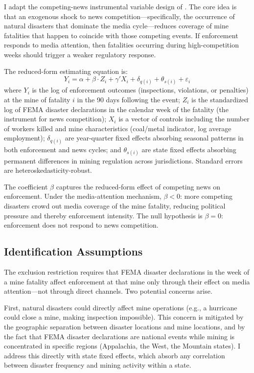 \documentclass[12pt]{article}
\begin{document}
I adapt the competing-news instrumental variable design of \citet{eisensee2007news}. The core idea is that an exogenous shock to news competition---specifically, the occurrence of natural disasters that dominate the media cycle---reduces coverage of mine fatalities that happen to coincide with those competing events. If enforcement responds to media attention, then fatalities occurring during high-competition weeks should trigger a weaker regulatory response.

The reduced-form estimating equation is:
\begin{equation}
\label{eq:reduced}
Y_{i} = \alpha + \beta \cdot Z_{i} + \gamma' X_{i} + \delta_{q(i)} + \theta_{s(i)} + \varepsilon_{i}
\end{equation}
where $Y_{i}$ is the log of enforcement outcomes (inspections, violations, or penalties) at the mine of fatality $i$ in the 90 days following the event; $Z_{i}$ is the standardized log of FEMA disaster declarations in the calendar week of the fatality (the instrument for news competition); $X_{i}$ is a vector of controls including the number of workers killed and mine characteristics (coal/metal indicator, log average employment); $\delta_{q(i)}$ are year-quarter fixed effects absorbing seasonal patterns in both enforcement and news cycles; and $\theta_{s(i)}$ are state fixed effects absorbing permanent differences in mining regulation across jurisdictions. Standard errors are heteroskedasticity-robust.

The coefficient $\beta$ captures the reduced-form effect of competing news on enforcement. Under the media-attention mechanism, $\beta < 0$: more competing disasters crowd out media coverage of the mine fatality, reducing political pressure and thereby enforcement intensity. The null hypothesis is $\beta = 0$: enforcement does not respond to news competition.

\subsection{Identification Assumptions}

The exclusion restriction requires that FEMA disaster declarations in the week of a mine fatality affect enforcement at that mine only through their effect on media attention---not through direct channels. Two potential concerns arise.

First, natural disasters could directly affect mine operations (e.g., a hurricane could close a mine, making inspection impossible). This concern is mitigated by the geographic separation between disaster locations and mine locations, and by the fact that FEMA disaster declarations are national events while mining is concentrated in specific regions (Appalachia, the West, the Mountain states). I address this directly with state fixed effects, which absorb any correlation between disaster frequency and mining activity within a state.
\end{document}
